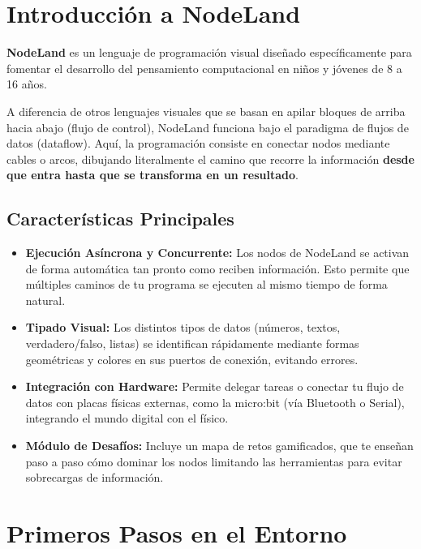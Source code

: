 \label{apx:user-manual}

\section*{Introducción a NodeLand}

\textbf{NodeLand} es un lenguaje de programación visual diseñado específicamente para fomentar el desarrollo del pensamiento computacional en niños y jóvenes de 8 a 16 años.

A diferencia de otros lenguajes visuales que se basan en apilar bloques de arriba hacia abajo (flujo de control), NodeLand funciona bajo el paradigma de flujos de datos (dataflow). Aquí, la programación consiste en conectar nodos mediante cables o arcos, dibujando literalmente el camino que recorre la información \textbf{desde que entra hasta que se transforma en un resultado}.

\subsection*{Características Principales}

\begin{itemize}
    \item \textbf{Ejecución Asíncrona y Concurrente:} Los nodos de NodeLand se activan de forma automática tan pronto como reciben información. Esto permite que múltiples caminos de tu programa se ejecuten al mismo tiempo de forma natural.
    \item \textbf{Tipado Visual:} Los distintos tipos de datos (números, textos, verdadero/falso, listas) se identifican rápidamente mediante formas geométricas y colores en sus puertos de conexión, evitando errores.
    \item \textbf{Integración con Hardware:} Permite delegar tareas o conectar tu flujo de datos con placas físicas externas, como la micro:bit (vía Bluetooth o Serial), integrando el mundo digital con el físico.
    \item \textbf{Módulo de Desafíos:} Incluye un mapa de retos gamificados, que te enseñan paso a paso cómo dominar los nodos limitando las herramientas para evitar sobrecargas de información.
\end{itemize}

\section*{Primeros Pasos en el Entorno}

